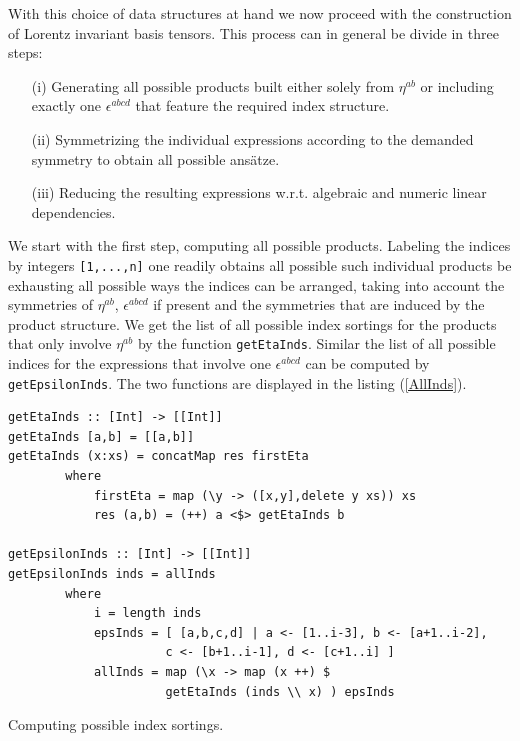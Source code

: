 \documentclass[a4paper,12pt, DIV=14, BCOR=5mm, twoside, headsepline, numbers=noenddot]{scrbook}
\begin{document}
With this choice of data structures at hand we now proceed with the construction of Lorentz invariant basis tensors.  
This process can in general be divide in three steps:
\begin{itemize}
    \item[(i)] Generating all possible products built either solely from $\eta^{ab}$ or including exactly one $\epsilon^{abcd}$ that feature the required index structure.
    \item[(ii)] Symmetrizing the individual expressions according to the demanded symmetry to obtain all possible ansätze.
    \item[(iii)] Reducing the resulting expressions w.r.t. algebraic and numeric linear dependencies.
\end{itemize}

We start with the first step, computing all possible products. Labeling the indices by integers \texttt{[1,...,n]} one readily obtains all possible such individual products be exhausting all possible ways the indices can be arranged, taking into account the symmetries of $\eta^{ab}$, $\epsilon^{abcd}$ if present and the symmetries that are induced by the product structure. We get the list of all possible index sortings for the products that only involve $\eta^{ab}$ by the function \texttt{getEtaInds}.
Similar the list of all possible indices for the expressions that involve one $\epsilon^{abcd}$ can be computed by \texttt{getEpsilonInds}. The two functions are displayed in the listing (\ref{AllInds}).
\begin{listing}[hbt!]
\begin{verbatim}
getEtaInds :: [Int] -> [[Int]]
getEtaInds [a,b] = [[a,b]]
getEtaInds (x:xs) = concatMap res firstEta
        where
            firstEta = map (\y -> ([x,y],delete y xs)) xs
            res (a,b) = (++) a <$> getEtaInds b 

getEpsilonInds :: [Int] -> [[Int]]
getEpsilonInds inds = allInds
        where
            i = length inds 
            epsInds = [ [a,b,c,d] | a <- [1..i-3], b <- [a+1..i-2],
                      c <- [b+1..i-1], d <- [c+1..i] ] 
            allInds = map (\x -> map (x ++) $
                      getEtaInds (inds \\ x) ) epsInds 
\end{verbatim} 
\caption{Computing possible index sortings.}\label{AllInds}
\end{listing}\\
\end{document}

